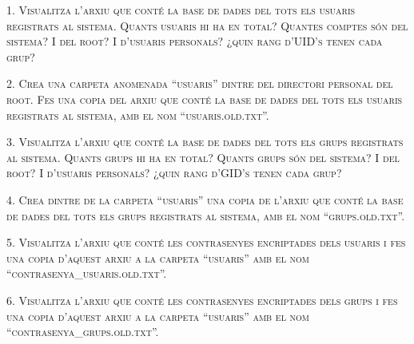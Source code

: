 \documentclass[a4paper,12pt]{article}
\begin{document}


\newpage
\textsc{1. Visualitza l’arxiu que conté la base de dades del tots els usuaris registrats al sistema. Quants usuaris hi ha en total? Quantes comptes són del sistema? I del root? I d’usuaris personals? ¿quin rang d’UID’s tenen cada grup?}

\textsc{2. Crea una carpeta anomenada “usuaris” dintre del directori personal del root. Fes una copia del arxiu que conté la base de dades del tots els usuaris registrats al sistema, amb el nom “usuaris.old.txt”.}

\textsc{3. Visualitza l’arxiu que conté la base de dades del tots els grups registrats al sistema. Quants grups hi ha en total? Quants grups són del sistema? I del root? I d’usuaris personals? ¿quin rang d’GID’s tenen cada grup?}

\textsc{4. Crea dintre de la carpeta “usuaris” una copia de l’arxiu que conté la base de dades del tots els grups registrats al sistema, amb el nom “grups.old.txt”.}

\textsc{5. Visualitza l’arxiu que conté les contrasenyes encriptades dels usuaris i fes una copia d’aquest arxiu a la carpeta “usuaris” amb el nom “contrasenya\_usuaris.old.txt”.}

\textsc{6. Visualitza l’arxiu que conté les contrasenyes encriptades dels grups i fes una copia d’aquest arxiu a la carpeta “usuaris” amb el nom “contrasenya\_grups.old.txt”.}
\end{document}
